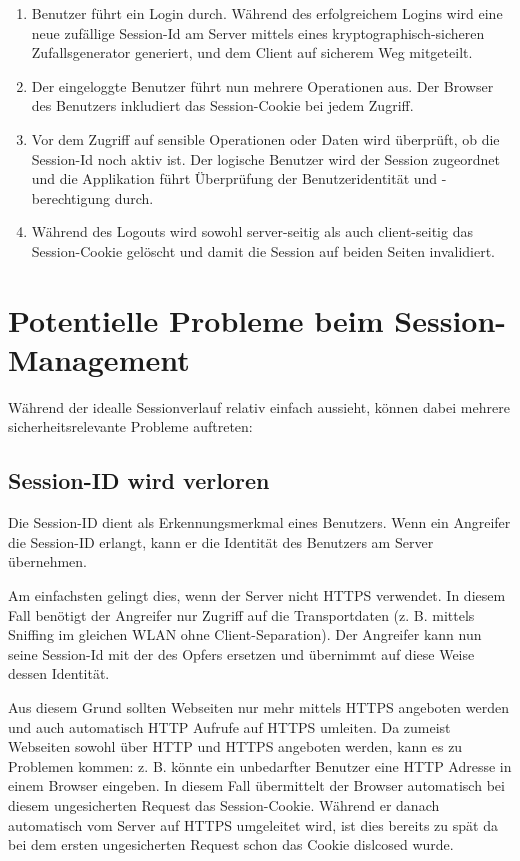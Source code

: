 \begin{enumerate}
	\item Benutzer führt ein Login durch. Während des erfolgreichem Logins wird eine neue zufällige Session-Id am Server mittels eines kryptographisch-sicheren Zufallsgenerator generiert, und dem Client auf sicherem Weg mitgeteilt.
	\item Der eingeloggte Benutzer führt nun mehrere Operationen aus. Der Browser des Benutzers inkludiert das Session-Cookie bei jedem Zugriff.
	\item Vor dem Zugriff auf sensible Operationen oder Daten wird überprüft, ob die Session-Id noch aktiv ist. Der logische Benutzer wird der Session zugeordnet und die Applikation führt Überprüfung der Benutzeridentität und -berechtigung durch.
	\item Während des Logouts wird sowohl server-seitig als auch client-seitig das Session-Cookie gelöscht und damit die Session auf beiden Seiten invalidiert.
\end{enumerate}

\section{Potentielle Probleme beim Session-Management}

Während der idealle Sessionverlauf relativ einfach aussieht, können dabei mehrere sicherheitsrelevante Probleme auftreten:

\subsection{Session-ID wird verloren}

Die Session-ID dient als Erkennungsmerkmal eines Benutzers. Wenn ein Angreifer die Session-ID erlangt, kann er die Identität des Benutzers am Server übernehmen.

Am einfachsten gelingt dies, wenn der Server nicht HTTPS verwendet. In diesem Fall benötigt der Angreifer nur Zugriff auf die Transportdaten (z. B. mittels Sniffing im gleichen WLAN ohne Client-Separation). Der Angreifer kann nun seine Session-Id mit der des Opfers ersetzen und übernimmt auf diese Weise dessen Identität.

Aus diesem Grund sollten Webseiten nur mehr mittels HTTPS angeboten werden und auch automatisch HTTP Aufrufe auf HTTPS umleiten. Da zumeist Webseiten sowohl über HTTP und HTTPS angeboten werden, kann es zu Problemen kommen: z. B. könnte ein unbedarfter Benutzer eine HTTP Adresse in einem Browser eingeben. In diesem Fall übermittelt der Browser automatisch bei diesem ungesicherten Request das Session-Cookie. Während er danach automatisch vom Server auf HTTPS umgeleitet wird, ist dies bereits zu spät da bei dem ersten ungesicherten Request schon das Cookie dislcosed wurde.


